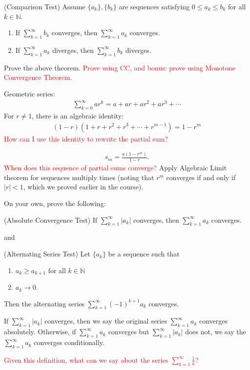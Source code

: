 \documentclass{ximera}
\begin{document}
\begin{theorem}{(Comparison Test)}
    Assume $\{a_k\}, \{b_k\}$ are sequences satisfying $0 \leq a_k \leq b_k$ for all $k \in \mathbb{N}$.
    \begin{enumerate}
        \item If $\sum\limits_{k=1}^\infty b_k$ converges, then $\sum\limits_{k=1}^\infty a_k$ converges.
        \item If $\sum\limits_{k=1}^\infty a_k$ diverges, then $\sum\limits_{k=1}^\infty b_k$ diverges.
    \end{enumerate}
\end{theorem}

\begin{exercise}
    Prove the above theorem. \textcolor{red}{Prove using CC, and bonus: prove using Monotone Convergence Theorem.}
\end{exercise}

Geometric series: 
\begin{align*}
    \sum\limits_{k=0}^\infty a r^k = a + ar + ar^2 + ar^3 + \cdots
\end{align*}
For $r \neq 1$, there is an algebraic identity:
\begin{align*}
    (1-r)(1+r+r^2 + r^3 + \cdots + r^{m-1}) = 1-r^m
\end{align*}
\textcolor{red}{How can I use this identity to rewrite the partial sum?}

\begin{align}
    s_m = \frac{a(1-r^m)}{1-r}.
\end{align}
\textcolor{red}{When does this sequence of partial sums converge?}  Apply Algebraic Limit theorem for sequences multiply times (noting that $r^m$ converges if and only if $|r|< 1$, which we proved earlier in the course).

On your own, prove the following: 
\begin{theorem}{(Absolute Convergence Test)}
If $\sum\limits_{k=1}^\infty |a_k|$ converges, then $\sum\limits_{k=1}^\infty a_k$ converges.
\end{theorem}
and 
\begin{theorem}{(Alternating Series Test)}
 Let $\{a_k\}$ be a sequence such that 
 \begin{enumerate}
     \item $a_k \geq a_{k+1}$ for all $k \in \mathbb{N}$
     \item $a_k \to 0$.
 \end{enumerate}
Then the alternating series $\sum\limits_{k=1}^\infty (-1)^{k+1}a_k$ converges.
\end{theorem}

\begin{definition}
    If $\sum\limits_{k=1}^\infty |a_k|$ converges, then we say the original series $\sum\limits_{k=1}^\infty a_k$ converges absolutely.  Otherwise, if $\sum\limits_{k=1}^\infty a_k$ converges but $\sum\limits_{k=1}^\infty |a_k|$ does not, we say the $\sum\limits_{k=1}^\infty a_k$ converges conditionally. 
\end{definition}
\textcolor{red}{Given this definition, what can we say about the series $\sum\limits_{k=1}^\infty \frac1k$?}
\end{document}
